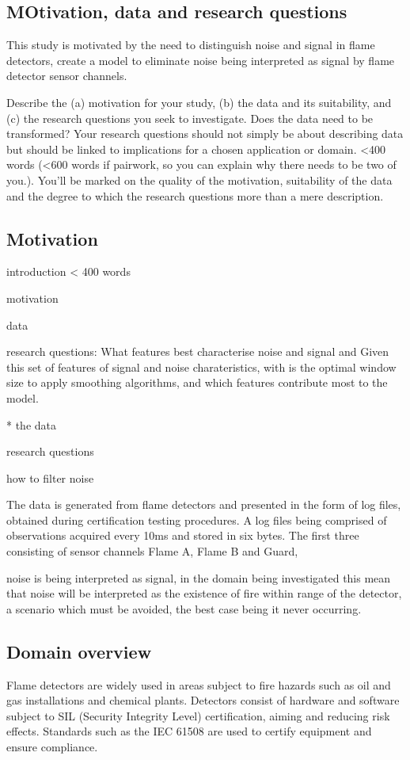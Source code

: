 \subsection{MOtivation, data and research questions}

This study is motivated by the need to distinguish noise and signal in flame detectors,  create a model to eliminate noise being interpreted as signal by flame detector sensor channels.

 Describe the (a) motivation for your study, (b) the data and its suitability, and (c) the research questions you seek to investigate. Does the data need to be transformed? Your research questions should not simply be about describing data but should be linked to implications for a chosen application or domain. <400 words (<600 words if pairwork, so you can explain why there needs to be two of you.).
You'll be marked on the quality of the motivation, suitability of the data and the degree to which the research questions more than a mere description.

\subsection{Motivation}

introduction < 400 words

motivation

data

research questions: What features best characterise noise and signal and
Given this set of features of signal and noise charateristics, with is the optimal window size to apply smoothing algorithms, and which features contribute most to the model.

* the data

research questions

how to filter noise

The data is generated from flame detectors and presented in the form of log files, obtained during certification testing procedures. A log files being comprised of observations acquired every 10ms and stored in six bytes. The first three consisting of sensor channels Flame A, Flame B and Guard,

noise is being interpreted as signal, in the domain being investigated this mean that noise will be interpreted as the existence of fire within range of the detector, a scenario which must be avoided, the best case being it never occurring. 



\subsection{Domain overview}
Flame detectors are widely used in areas subject to fire hazards such as oil and gas installations and chemical plants. Detectors consist of hardware and software subject to SIL (Security Integrity Level) certification, aiming and reducing risk effects. Standards such as the IEC 61508\cite{wiki:IEC61508} are used to certify equipment and ensure compliance.  

